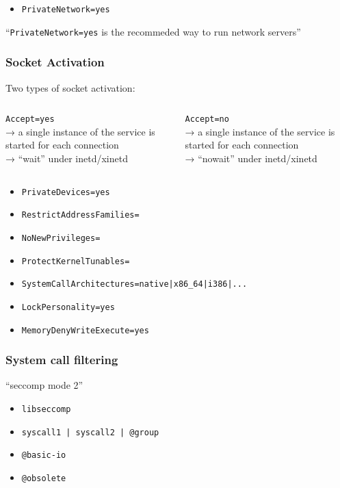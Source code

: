 \documentclass[serif]{beamer}
\begin{document}
\begin{frame}
  \begin{itemize}
  \item \texttt{PrivateNetwork=yes}
  \end{itemize}

  ``\texttt{PrivateNetwork=yes} is the recommeded way to run network servers''
\end{frame}

\begin{frame}[c]
  \frametitle{Socket Activation}

  \centering
  Two types of socket activation:

  \medskip
  
  \begin{columns}
    \begin{column}{0.5\textwidth}
      \texttt{Accept=yes}\\
      → a single instance of the service is started for each connection\\
      → ``wait'' under inetd/xinetd
    \end{column}
    \begin{column}{0.5\textwidth}
      \texttt{Accept=no}\\
      → a single instance of the service is started for each connection\\
      → ``nowait'' under inetd/xinetd
    \end{column}
  \end{columns}

\end{frame}

\begin{frame}
  \begin{itemize}
  \item \texttt{PrivateDevices=yes}
  \item \texttt{RestrictAddressFamilies=}
  \item \texttt{NoNewPrivileges=}
  \item \texttt{ProtectKernelTunables=}
  \item \texttt{SystemCallArchitectures=native|x86\_64|i386|...}
  \item \texttt{LockPersonality=yes}
  \item \texttt{MemoryDenyWriteExecute=yes}
  \end{itemize}
\end{frame}

\begin{frame}
  \frametitle{System call filtering}
  ``seccomp mode 2''
  \begin{itemize}
  \item \texttt{libseccomp}
  \item \texttt{syscall1 | syscall2 | @group}
  \item \texttt{@basic-io}
  \item \texttt{@obsolete}
  \end{itemize}
\end{frame}
\end{document}
